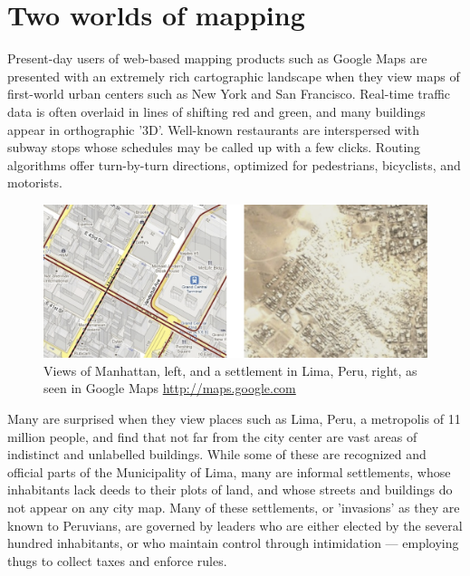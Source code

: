 \documentclass[11pt]{report}
\begin{document}
\section{Two worlds of mapping}
\label{sec:twoworlds}

Present-day users of web-based mapping products such as Google Maps are presented with an extremely rich cartographic landscape when they view maps of first-world urban centers such as New York and San Francisco. Real-time traffic data is often overlaid in lines of shifting red and green, and many buildings appear in orthographic '3D'. Well-known restaurants are interspersed with subway stops whose schedules may be called up with a few clicks. Routing algorithms offer turn-by-turn directions, optimized for pedestrians, bicyclists, and motorists. 

\begin{figure}[h]
	\begin{center}
		\includegraphics[width=1\textwidth]{images/two-worlds-mapping.png}
		\caption{Views of Manhattan, left, and a settlement in Lima, Peru, right, as seen in Google Maps \url{http://maps.google.com}}
	\end{center}
\end{figure}

Many are surprised when they view places such as Lima, Peru, a metropolis of 11 million people, and find that not far from the city center are vast areas of indistinct and unlabelled buildings. While some of these are recognized and official parts of the Municipality of Lima, many are informal settlements, whose inhabitants lack deeds to their plots of land, and whose streets and buildings do not appear on any city map. Many of these settlements, or 'invasions' as they are known to Peruvians, are governed by leaders who are either elected by the several hundred inhabitants, or who maintain control through intimidation --- employing thugs to collect taxes and enforce rules. 
\end{document}
